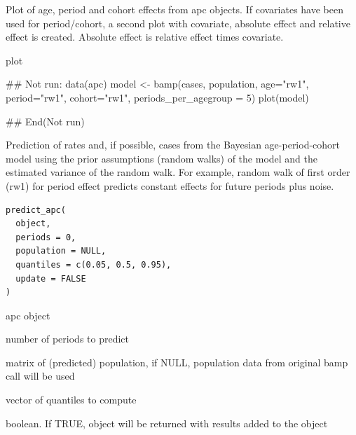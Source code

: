 \documentclass[a4paper]{book}
\begin{document}
%
\begin{Details}
Plot of age, period and cohort effects from apc objects. If covariates have been used for period/cohort, a second plot with covariate, absolute effect and relative effect is created. Absolute effect is relative effect times covariate.
\end{Details}
%
\begin{Value}
plot
\end{Value}
%
\begin{Examples}
\begin{ExampleCode}
## Not run: 
data(apc)
model <- bamp(cases, population, age="rw1", period="rw1", cohort="rw1", periods_per_agegroup = 5)
plot(model)

## End(Not run)
\end{ExampleCode}
\end{Examples}
%
\begin{Description}
Prediction of rates and, if possible, cases from the Bayesian age-period-cohort model 
using the prior assumptions (random walks) of the model and the estimated variance of the random walk.
For example, random walk of first order (rw1) for period effect predicts constant effects for future periods plus noise.
\end{Description}
%
\begin{Usage}
\begin{verbatim}
predict_apc(
  object,
  periods = 0,
  population = NULL,
  quantiles = c(0.05, 0.5, 0.95),
  update = FALSE
)
\end{verbatim}
\end{Usage}
%
\begin{Arguments}
\begin{ldescription}
\item[\code{object}] apc object

\item[\code{periods}] number of periods to predict

\item[\code{population}] matrix of (predicted) population, if NULL, population data from original bamp call will be used

\item[\code{quantiles}] vector of quantiles to compute

\item[\code{update}] boolean. If TRUE, object will be returned with results added to the object
\end{ldescription}
\end{Arguments}
\end{document}
